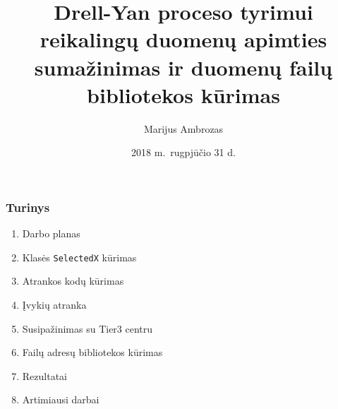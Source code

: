 \documentclass{beamer}
\title[Vasaros darbai]{Drell-Yan proceso tyrimui reikalingų duomenų apimties sumažinimas ir duomenų failų bibliotekos kūrimas}
\author[M.\ Ambrozas]{Marijus Ambrozas}
\date[2018-08-31]{2018 m.\ rugpjūčio 31 d.}
\begin{document}
\frame{\titlepage}


\begin{frame}
\frametitle{Turinys}

\begin{enumerate}
	\item Darbo planas
	\item Klasės \texttt{SelectedX} kūrimas
	\item Atrankos kodų kūrimas
	\item Įvykių atranka
	\item Susipažinimas su Tier3 centru
	\item Failų adresų bibliotekos kūrimas
	\item Rezultatai
	\item Artimiausi darbai
\end{enumerate}

\end{frame}
\end{document}
